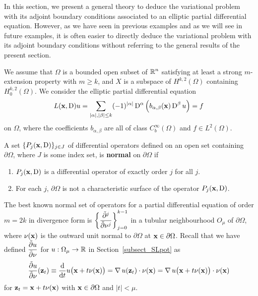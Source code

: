 In this section, we present a general theory to deduce the variational
problem with its adjoint boundary conditions associated to an elliptic partial
differential equation.  However, as we have seen in previous examples
and as we will see in future examples, it is often easier to directly 
deduce the variational problem with its adjoint boundary conditions
without referring to the general results of the present section.

We assume that $\Omega$ is a bounded open
subset of $\displaystyle \RR^n$ satisfying at least a strong
$m$-extension property with $m\geq k$, and $X$ is a subspace of
$\displaystyle H^{k,2}(\Omega)$ containing
$\displaystyle H^{k,2}_0(\Omega)$.  We consider the elliptic partial 
differential equation
\[
L(\VEC{x}, \diff)u = \sum_{|\alpha|,|\beta|\leq k} (-1)^{|\alpha|} \diff^\alpha
\left( b_{\alpha,\beta}(\VEC{x}) \diff^\beta u\right) = f
\]
on $\Omega$, where the coefficients $b_{\alpha,\beta}$ are all of class
$\displaystyle C^\infty_b(\Omega)$ and $f\in L^2(\Omega)$.

\begin{defn}
A set $\{P_j(\VEC{x},\diff) \}_{j\in J}$ of differential operators defined
on an open set containing $\partial \Omega$, where $J$ is some index set, is
{\bfseries normal} on
$\partial \Omega$ if
\begin{enumerate}
\item $P_j(\VEC{x},\diff)$ is a differential operator of exactly order $j$
for all $j$. 
\item For each $j$, $\partial \Omega$ is not a characteristic surface
of the operator $P_j(\VEC{x},\diff)$.
\end{enumerate}
\end{defn}

The best known normal set of operators for a partial differential
equation of order $m=2k$ in divergence form is
$\displaystyle \left\{ \pdydxnS{}{\VEC{\nu}}{j} \right\}_{j=0}^{k-1}$
in a tubular neighbourhood $O_\mu$ of $\partial \Omega$,
where $\VEC{\nu}(\VEC{x})$ is the outward unit normal to
$\partial \Omega$ at $\VEC{x}\in \partial \Omega$.
Recall that we have defined $\displaystyle \pdydxS{u}{\VEC{\nu}}$
for $u:\Omega_\mu \to \RR$ in Section~\ref{subsect_SLpot} as
\[
\pdydxS{u}{\VEC{\nu}}(\VEC{z}_t)
\equiv \dfdx{u\big(\VEC{x}+t\VEC{\nu}(\VEC{x})\big)}{t}
= \graD u(\VEC{z}_t) \cdot \VEC{\nu}(\VEC{x})
= \graD u\big(\VEC{x}+t\VEC{\nu}(\VEC{x})\big) \cdot \VEC{\nu}(\VEC{x})
\]
for $\VEC{z}_t = \VEC{x} + t\nu(\VEC{x})$ with $\VEC{x} \in \partial \Omega$
and $|t|< \mu$.

